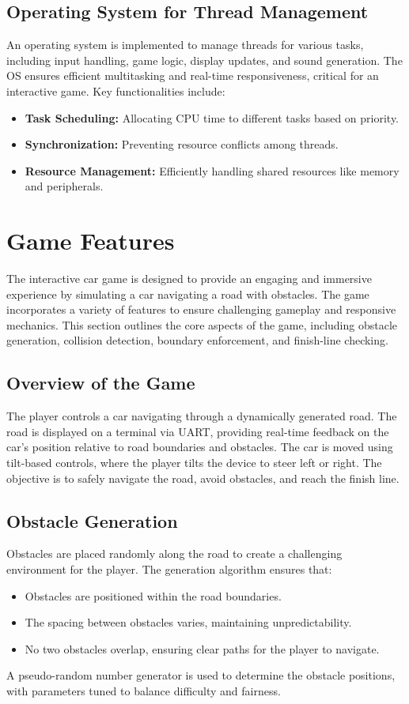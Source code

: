 \documentclass[conference]{IEEEtran}
\begin{document}
\subsection{Operating System for Thread Management}
An operating system is implemented to manage threads for various tasks, including input handling, game logic, display updates, and sound generation. The OS ensures efficient multitasking and real-time responsiveness, critical for an interactive game. Key functionalities include:
\begin{itemize}
    \item \textbf{Task Scheduling:} Allocating CPU time to different tasks based on priority.
    \item \textbf{Synchronization:} Preventing resource conflicts among threads.
    \item \textbf{Resource Management:} Efficiently handling shared resources like memory and peripherals.
\end{itemize}

\section{Game Features}
The interactive car game is designed to provide an engaging and immersive experience by simulating a car navigating a road with obstacles. The game incorporates a variety of features to ensure challenging gameplay and responsive mechanics. This section outlines the core aspects of the game, including obstacle generation, collision detection, boundary enforcement, and finish-line checking.

\subsection{Overview of the Game}
The player controls a car navigating through a dynamically generated road. The road is displayed on a terminal via UART, providing real-time feedback on the car's position relative to road boundaries and obstacles. The car is moved using tilt-based controls, where the player tilts the device to steer left or right. The objective is to safely navigate the road, avoid obstacles, and reach the finish line.

\subsection{Obstacle Generation}
Obstacles are placed randomly along the road to create a challenging environment for the player. The generation algorithm ensures that:
\begin{itemize}
    \item Obstacles are positioned within the road boundaries.
    \item The spacing between obstacles varies, maintaining unpredictability.
    \item No two obstacles overlap, ensuring clear paths for the player to navigate.
\end{itemize}
A pseudo-random number generator is used to determine the obstacle positions, with parameters tuned to balance difficulty and fairness.
\end{document}
